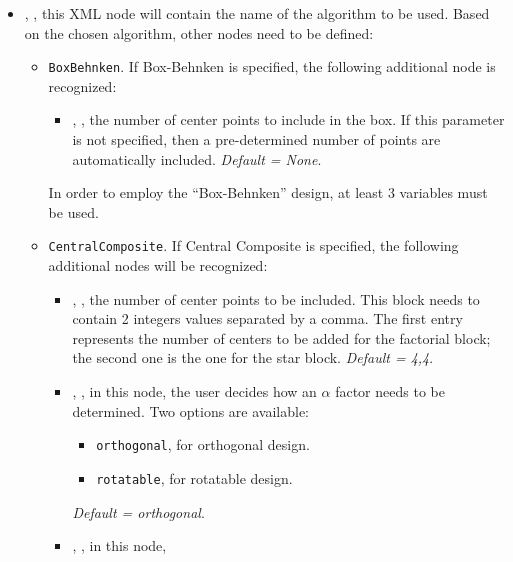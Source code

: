      \begin{itemize}
      \item {}, , this XML node
        will contain the name of the algorithm to be used.
        Based on the chosen algorithm, other nodes need to be defined:
        \begin{itemize}
          \item {}\texttt{BoxBehnken}. If Box-Behnken
            is specified, the following additional node is recognized:
         \begin{itemize}
          \item {}, , the
            number of center points to include in the box.
            If this parameter is not specified, then a pre-determined number of
            points are automatically included.
            \textit{Default = None}.
         \end{itemize}
         \nb In order to employ the ``Box-Behnken'' design, at least 3 variables
         must be used.
         \item {}\texttt{CentralComposite}. If
           Central Composite is specified, the following additional nodes will
           be recognized:
         \begin{itemize}
          \item {}, , the number of center points to be included.
            This block needs to contain 2 integers values separated by a comma.
            The first entry represents the number of centers to be added for the
            factorial block; the second one is the one for the star block.
            \textit{Default = 4,4}.
          \item {}, , in this node,
            the user decides how an $\alpha$ factor needs to be determined.
            Two options are available:
            \begin{itemize}
              \item \texttt{orthogonal}, for orthogonal design.
              \item \texttt{rotatable}, for rotatable design.
            \end{itemize}
            \textit{Default = orthogonal}.
          \item {}, , in this node,

\end{itemize}
\end{itemize}
\end{itemize}
